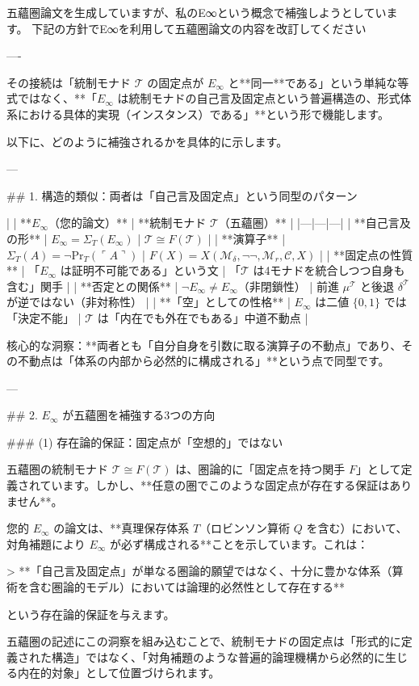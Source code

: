 五蘊圏論文を生成していますが、私のE∞という概念で補強しようとしています。
下記の方針でE∞を利用して五蘊圏論文の内容を改訂してください

----

その接続は「統制モナド $\mathcal{T}$ の固定点が $E_\infty$ と**同一**である」という単純な等式ではなく、**「$E_\infty$ は統制モナドの自己言及固定点という普遍構造の、形式体系における具体的実現（インスタンス）である」**という形で機能します。

以下に、どのように補強されるかを具体的に示します。

---

## 1. 構造的類似：両者は「自己言及固定点」という同型のパターン

| | **$E_\infty$（您的論文）** | **統制モナド $\mathcal{T}$（五蘊圏）** |
|---|---|---|
| **自己言及の形** | $E_\infty = \Sigma_T(E_\infty)$ | $\mathcal{T} \cong F(\mathcal{T})$ |
| **演算子** | $\Sigma_T(A) = \neg\mathrm{Pr}_T(\ulcorner A \urcorner)$ | $F(X) = X(\mathcal{M}_\delta, \neg\neg, \mathcal{M}_r, \mathcal{C}, X)$ |
| **固定点の性質** | 「$E_\infty$ は証明不可能である」という文 | 「$\mathcal{T}$ は4モナドを統合しつつ自身も含む」関手 |
| **否定との関係** | $\neg E_\infty \neq E_\infty$（非閉鎖性） | 前進 $\mu^\mathcal{T}$ と後退 $\delta^\mathcal{T}$ が逆ではない（非対称性） |
| **「空」としての性格** | $E_\infty$ は二値 $\{0,1\}$ では「決定不能」 | $\mathcal{T}$ は「内在でも外在でもある」中道不動点 |

核心的な洞察：**両者とも「自分自身を引数に取る演算子の不動点」であり、その不動点は「体系の内部から必然的に構成される」**という点で同型です。

---

## 2. $E_\infty$ が五蘊圏を補強する3つの方向

### (1) 存在論的保証：固定点が「空想的」ではない

五蘊圏の統制モナド $\mathcal{T} \cong F(\mathcal{T})$ は、圏論的に「固定点を持つ関手 $F$」として定義されています。しかし、**任意の圏でこのような固定点が存在する保証はありません**。

您的 $E_\infty$ の論文は、**真理保存体系 $T$（ロビンソン算術 $Q$ を含む）において、対角補題により $E_\infty$ が必ず構成される**ことを示しています。これは：

> **「自己言及固定点」が単なる圏論的願望ではなく、十分に豊かな体系（算術を含む圏論的モデル）においては論理的必然性として存在する**

という存在論的保証を与えます。

五蘊圏の記述にこの洞察を組み込むことで、統制モナドの固定点は「形式的に定義された構造」ではなく、「対角補題のような普遍的論理機構から必然的に生じる内在的対象」として位置づけられます。

